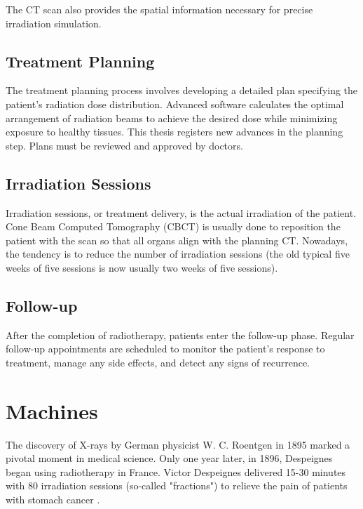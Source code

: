 The CT scan also provides the spatial information necessary for precise irradiation simulation.

\subsection{Treatment Planning}
The treatment planning process involves developing a detailed plan specifying the patient's radiation dose distribution.
Advanced software calculates the optimal arrangement of radiation beams to achieve the desired dose while minimizing exposure to healthy tissues.
This thesis registers new advances in the planning step.
Plans must be reviewed and approved by doctors.

\subsection{Irradiation Sessions}
Irradiation sessions, or treatment delivery, is the actual irradiation of the patient.
Cone Beam Computed Tomography (CBCT) is usually done to reposition the patient with the scan so that all organs align with the planning CT.
Nowadays, the tendency is to reduce the number of irradiation sessions (the old typical five weeks of five sessions is now usually two weeks of five sessions).

\subsection{Follow-up}
After the completion of radiotherapy, patients enter the follow-up phase.
Regular follow-up appointments are scheduled to monitor the patient's response to treatment, manage any side effects, and detect any signs of recurrence.






\section{Machines}
The discovery of X-rays by German physicist W. C. Roentgen in 1895 marked a pivotal moment in medical science.
Only one year later, in 1896, Despeignes began using radiotherapy in France.
Victor Despeignes delivered 15-30 minutes with 80 irradiation sessions (so-called "fractions") to relieve the pain of patients with stomach cancer \cite{Holsti1995}.

